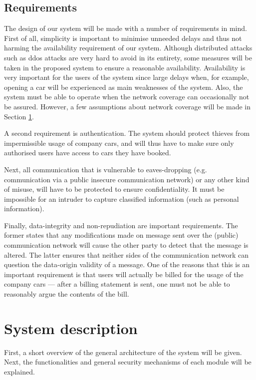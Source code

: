 \documentclass[12pt,a4paper, oneside]{article}
\newlength{\drop}
\begin{document}
\subsection{Requirements}
The design of our system will be made with a number of requirements in mind. First of all, simplicity is important to minimise unneeded delays and thus not harming the availability requirement of our system. Although distributed attacks such as \gls{ddos} attacks are very hard to avoid in its entirety, some measures will be taken in the proposed system to ensure a reasonable availability. Availability is very important for the users of the system since large delays when, for example, opening a car will be experienced as main weaknesses of the system. Also, the system must be able to operate when the network coverage can occasionally not be assured. However, a few assumptions about network coverage will be made in Section \ref{sec:system-description}.\par
A second requirement is authentication. The system should protect thieves from impermissible usage of company cars, and will thus have to make sure only authorised users have access to cars they have booked.\par
Next, all communication that is vulnerable to eaves-dropping (e.g. communication via a public insecure communication network) or any other kind of misuse, will have to be protected to ensure confidentiality. It must be impossible for an intruder to capture classified information (such as personal information).\par
Finally, data-integrity and non-repudiation are important requirements. The former states that any modifications made on message sent over the (public) communication network will cause the other party to detect that the message is altered. The latter ensures that neither sides of the communication network can question the data-origin validity of a message. One of the reasons that this is an important requirement is that users will actually be billed for the usage of the company cars --- after a billing statement is sent, one must not be able to reasonably argue the contents of the bill.


\section{System description}\label{sec:system-description}
First, a short overview of the general architecture of the system will be given. Next, the functionalities and general security mechanisms of each module will be explained.
\end{document}
